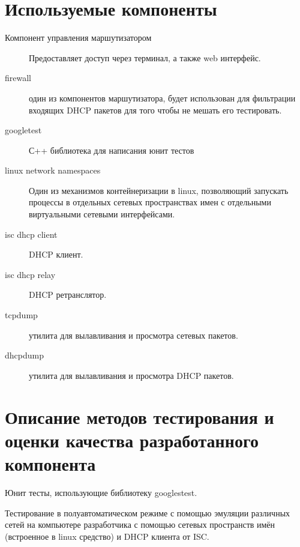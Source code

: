 \documentclass[12pt]{article}
\begin{document}
\section{Используемые компоненты}
\begin{description}
    \item[Компонент управления маршутизатором] Предоставляет доступ через терминал, а также web интерфейс.
    \item[firewall] один из компонентов маршутизатора, будет использован для фильтрации входящих DHCP пакетов для того чтобы не мешать его тестировать.
    \item[googletest] С++ библиотека для написания юнит тестов
    \item[linux network namespaces] Один из механизмов контейнеризации в linux, позволяющий запускать процессы в отдельных сетевых пространствах имен с отдельными виртуальными сетевыми интерфейсами.
    \item[isc dhcp client] DHCP клиент.
    \item[isc dhcp relay] DHCP ретранслятор.
    \item[ tcpdump] утилита для вылавливания и просмотра сетевых пакетов.
    \item[dhcpdump] утилита для вылавливания и просмотра DHCP пакетов.
\end{description}

\section{Описание методов тестирования и оценки качества разработанного компонента}
Юнит тесты, использующие библиотеку googlestest.

Тестирование в полуавтоматическом режиме с помощью эмуляции различных сетей на компьютере разработчика с помощью сетевых пространств имён (встроенное в linux средство) и DHCP клиента от ISC.

\end{document}
